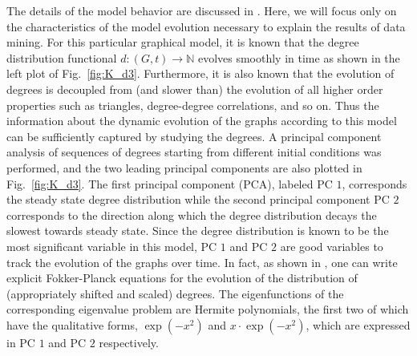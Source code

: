 % 
The details of the model behavior are discussed in
\cite{bold2014equation}.
% 
Here, we will focus only on the characteristics of the model evolution
necessary to explain the results of data mining.
% 
For this particular graphical model, it is known that the degree
distribution functional $d: (G,t) \rightarrow \mathbb{N}$ evolves
smoothly in time as shown in the left plot of Fig.~\ref{fig:K_d3}.
% 
Furthermore, it is also known that the evolution of degrees is
decoupled from (and slower than) the evolution of all higher order
properties such as triangles, degree-degree correlations, and so on.
% 
Thus the information about the dynamic evolution of the graphs
according to this model can be sufficiently captured by studying the
degrees.
% 
A principal component analysis of sequences of degrees starting from
different initial conditions was performed, and the two leading
principal components are also plotted in Fig.~\ref{fig:K_d3}.
% 
The first principal component (PCA), labeled PC $1$, corresponds the
steady state degree distribution while the second principal component
PC $2$ corresponds to the direction along which the degree
distribution decays the slowest towards steady state.
% 
Since the degree distribution is known to be the most significant
variable in this model, PC $1$ and PC $2$ are good variables to track
the evolution of the graphs over time.
% 
In fact, as shown in \cite{bold2014equation}, one can write explicit
Fokker-Planck equations for the evolution of the distribution of
(appropriately shifted and scaled) degrees.
% 
The eigenfunctions of the corresponding eigenvalue problem are Hermite
polynomials, the first two of which have the qualitative forms,
$\exp(-x^2)$ and $x \cdot \exp(-x^2)$, which are expressed in PC $1$
and PC $2$ respectively.
% 


